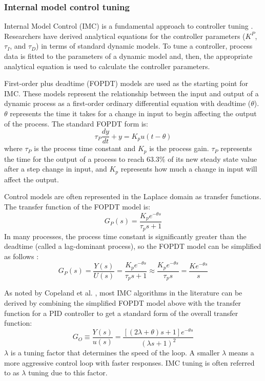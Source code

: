 \subsubsection{Internal model control tuning}
Internal Model Control (IMC) is a fundamental approach to controller tuning \cite{Skogestad2003}. Researchers have derived analytical equations for the controller parameters ($K^P$, $\tau_I$, and $\tau_D$) in terms of standard dynamic models. To tune a controller, process data is  fitted to the parameters of a dynamic model and, then, the appropriate analytical equation is used to calculate the controller parameters.

First-order plus deadtime (FOPDT) models are used as the starting point for IMC. These models represent the relationship between the input and output of a dynamic process as a first-order ordinary differential equation with deadtime ($\theta$). $\theta$ represents the time it takes for a change in input to begin affecting the output of the process. The standard FOPDT form is:
\begin{equation}
    \tau_P \frac{dy}{dt} + y = K_p u(t-\theta)
\end{equation}
where $\tau_P$ is the process time constant and $K_p$ is the process gain. $\tau_P$ represents the time for the output of a process to reach 63.3\% of its new steady state value after a step change in input, and $K_p$ represents how much a change in input will affect the output.  

Control models are often represented in the Laplace domain as transfer functions. The transfer function of the FOPDT model is:
\begin{equation}
    G_P(s) = \frac{K_p e^{-\theta s}}{\tau_p s +1}
\end{equation}
In many processes, the process time constant is significantly greater than the deadtime (called a lag-dominant process), so the FOPDT model can be simplified as follows \cite{Copeland2010}:
\begin{equation}
    G_P(s) = \frac{Y(s)}{U(s)} = \frac{K_p e^{-\theta s}}{\tau_p s +1} \approx \frac{K_p e^{-\theta s}}{\tau_p s } = \frac{K e^{-\theta s}}{s}
\end{equation}

As noted by Copeland et al. \cite{Copeland2010}, most IMC algorithms in the literature can be derived by combining the simplified FOPDT model above with the transfer function for a PID controller to get a standard form of the overall transfer function:
\begin{equation}
    G_O \equiv \frac{Y(s)}{u(s)} = \frac{[(2\lambda + \theta)s+1]e^{-\theta s}}{(\lambda s+1)^2}
\end{equation}
$\lambda$ is a tuning factor that determines the speed of the loop. A smaller $\lambda$ means a more aggressive control loop with faster responses. IMC tuning is often referred to as $\lambda$ tuning due to this factor. 

